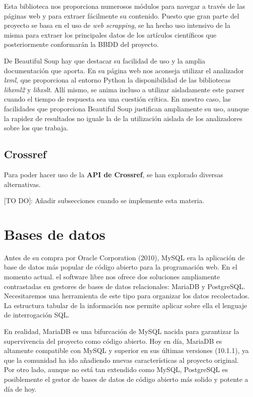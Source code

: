 Esta biblioteca nos proporciona numerosos módulos para navegar a través de las páginas web y para extraer fácilmente su contenido. Puesto que gran parte del proyecto se basa en el uso de \textit{web scrapping}, se ha hecho uso intensivo de la misma para extraer los principales datos de los artículos científicos que posteriormente conformarán la BBDD del proyecto.

De Beautiful Soup hay que destacar su facilidad de uso y la amplia documentación que aporta. En su página web nos aconseja utilizar el analizador \textit{lxml}, que proporciona al entorno Python la disponibilidad de las bibliotecas \textit{libxml2} y \textit{libxslt}. Allí mismo, se anima incluso a utilizar aisladamente este parser cuando el tiempo de respuesta sea una cuestión crítica. En nuestro caso, las facilidades que proporciona Beautiful Soup justifican ampliamente su uso, aunque la  rapidez de resultados no iguale la de la utilización aislada de los analizadores sobre los que trabaja.
 

\subsection{Crossref}
Para poder hacer uso de la \textbf{API de Crossref}, se han explorado diversas alternativas.

\color{red} [TO DO]: Añadir subsecciones cuando se implemente esta materia.\color{black}



\section{Bases de datos}

Antes de su compra por Oracle Corporation (2010), MySQL era la aplicación de base de datos más popular de código abierto para la programación web. En el momento actual. el software libre nos ofrece dos soluciones ampliamente contrastadas en gestores de bases de datos relacionales: MariaDB y PostgreSQL. Necesitaremos una herramienta de este tipo para organizar los datos recolectados. La estructura tabular de la información nos permite aplicar sobre ella el lenguaje de interrogación SQL.

En realidad, MariaDB es una bifurcación de MySQL nacida para garantizar la supervivencia del proyecto como código abierto. Hoy en día, MariaDB es altamente compatible con MySQL y superior en sus últimas versiones (10.1.1), ya que la comunidad ha ido añadiendo nuevas características al proyecto original. Por otro lado, aunque no está tan extendido como MySQL, PostgreSQL es posiblemente el gestor de bases de datos de código abierto más solido y potente a día de hoy.


